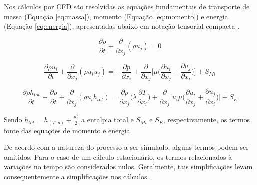 Nos cálculos por CFD são resolvidas as equações fundamentais de transporte de massa (Equação \ref{eq:massa}),
momento (Equação \ref{eq:momento}) e energia (Equação \ref{eq:energia}), apresentadas abaixo em notação tensorial compacta \cite{dosSantos2012}.

\begin{equation}
  \label{eq:massa}
  \frac{\partial \rho}{\partial t}+\frac{\partial}{\partial x_j}(\rho u_j)=0
\end{equation}

\begin{equation}
  \label{eq:momento}
  \frac{\partial \rho u_i}{\partial t}+\frac{\partial}{\partial x_j}(\rho u_i u_j)=
  -\frac{\partial p}{\partial x_i} + \frac{\partial}{\partial x_j}\bigg[ \mu \bigg( \frac{\partial u_i}{\partial x_j} + \frac{\partial u_j}{\partial x_i}\bigg)\bigg]+S_{Mi}
\end{equation}

\begin{equation}
  \label{eq:energia}
  \frac{\partial \rho h_{tot}}{\partial t}-\frac{\partial \rho}{\partial t}+\frac{\partial}{\partial x_j}(\rho u_i h_{tot})=
  \frac{\partial p}{\partial x_j}\bigg( \lambda \frac{\partial T}{\partial x_i}\bigg) + \frac{\partial}{\partial x_j}\bigg[ u_i\mu \bigg( \frac{\partial u_i}{\partial x_j} + \frac{\partial u_j}{\partial x_i}\bigg)\bigg]+S_{E}
\end{equation}

Sendo $h_{tot} = h_{(T,p)} + \frac{u_i^{2}}{2}$ a entalpia total e $S_{Mi}$ e $S_E$, respectivamente, os termos
fonte das equações de momento e energia.

De acordo com a natureza do processo a ser simulado, alguns termos podem ser omitidos. Para o
caso de um cálculo estacionário, os termos relacionados à variações no tempo são
considerados nulos. Geralmente, tais simplificações levam consequentemente a
simplificações nos cálculos.





